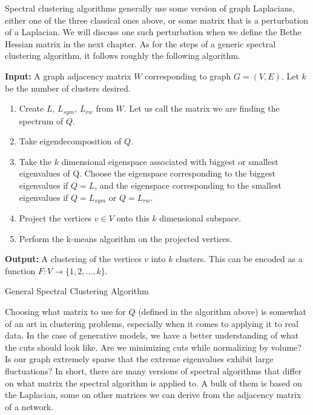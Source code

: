  Spectral clustering algorithms generally use some version of graph Laplacians, either one of the three classical ones above, or some matrix that is a perturbation of a Laplacian.  We will discuss one such perturbation when we define the Bethe Hessian matrix in the next chapter.  As for the steps of a generic spectral clustering algorithm, it follows roughly the following algorithm.  

\begin{algorithm}[H]
 \textbf{Input: } A graph adjacency matrix $W$ corresponding to graph $G = (V, E)$. Let $k$ be the number of clusters desired.
 
 \begin{enumerate}
    \item Create $L$, $L_{sym}$, $L_{rw}$ from $W$.  Let us call the matrix we are finding the spectrum of $Q$. 
    \item Take eigendecomposition of $Q$.  
    \item Take the $k$ dimensional eigenspace associated with biggest or smallest eigenvalues of Q. Choose the eigenspace corresponding to the biggest eigenvalues if $Q = L$, and the eigenspace corresponding to the smallest eigenvalues if $Q= L_{sym}$ or $Q = L_{rw}$.  
    \item Project the vertices $v \in V$ onto this $k$ dimensional subspace.
    \item Perform the k-means algorithm on the projected vertices. 
 \end{enumerate}
 
 \textbf{Output:} A clustering of the vertices $v$ into $k$ clusters.  This can be encoded as a function $F: V \rightarrow \{1,2,...,k\}$.
 
 \caption{General Spectral Clustering Algorithm}
\end{algorithm}


Choosing what matrix to use for $Q$ (defined in the algorithm above) is somewhat of an art in clustering problems, especially when it comes to applying it to real data.  In the case of generative models, we have a better understanding of what the cuts should look like.  Are we minimizing cuts while normalizing by volume?  Is our graph extremely sparse that the extreme eigenvalues exhibit large fluctuations?  In short, there are many versions of spectral algorithms that differ on what matrix the spectral algorithm is applied to.  A bulk of them is based on the Laplacian, some on other matrices we can derive from the adjacency matrix of a network. 

